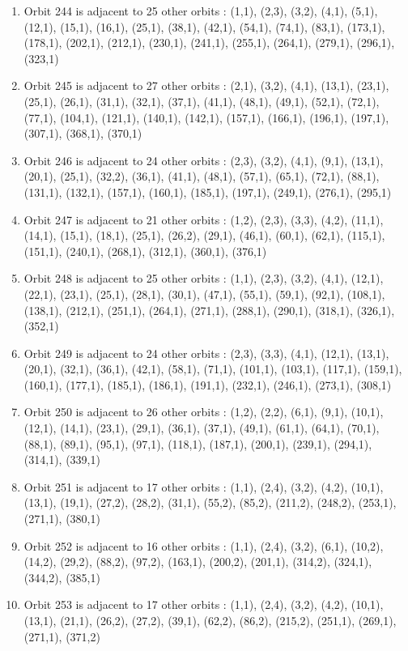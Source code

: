 \documentclass[12pt]{article}
\begin{document}
\begin{enumerate}
\item Orbit 244 is adjacent to 25 other orbits : (1,1), (2,3), (3,2), (4,1), (5,1), (12,1), (15,1), (16,1), (25,1), (38,1), (42,1), (54,1), (74,1), (83,1), (173,1), (178,1), (202,1), (212,1), (230,1), (241,1), (255,1), (264,1), (279,1), (296,1), (323,1)
\item Orbit 245 is adjacent to 27 other orbits : (2,1), (3,2), (4,1), (13,1), (23,1), (25,1), (26,1), (31,1), (32,1), (37,1), (41,1), (48,1), (49,1), (52,1), (72,1), (77,1), (104,1), (121,1), (140,1), (142,1), (157,1), (166,1), (196,1), (197,1), (307,1), (368,1), (370,1)
\item Orbit 246 is adjacent to 24 other orbits : (2,3), (3,2), (4,1), (9,1), (13,1), (20,1), (25,1), (32,2), (36,1), (41,1), (48,1), (57,1), (65,1), (72,1), (88,1), (131,1), (132,1), (157,1), (160,1), (185,1), (197,1), (249,1), (276,1), (295,1)
\item Orbit 247 is adjacent to 21 other orbits : (1,2), (2,3), (3,3), (4,2), (11,1), (14,1), (15,1), (18,1), (25,1), (26,2), (29,1), (46,1), (60,1), (62,1), (115,1), (151,1), (240,1), (268,1), (312,1), (360,1), (376,1)
\item Orbit 248 is adjacent to 25 other orbits : (1,1), (2,3), (3,2), (4,1), (12,1), (22,1), (23,1), (25,1), (28,1), (30,1), (47,1), (55,1), (59,1), (92,1), (108,1), (138,1), (212,1), (251,1), (264,1), (271,1), (288,1), (290,1), (318,1), (326,1), (352,1)
\item Orbit 249 is adjacent to 24 other orbits : (2,3), (3,3), (4,1), (12,1), (13,1), (20,1), (32,1), (36,1), (42,1), (58,1), (71,1), (101,1), (103,1), (117,1), (159,1), (160,1), (177,1), (185,1), (186,1), (191,1), (232,1), (246,1), (273,1), (308,1)
\item Orbit 250 is adjacent to 26 other orbits : (1,2), (2,2), (6,1), (9,1), (10,1), (12,1), (14,1), (23,1), (29,1), (36,1), (37,1), (49,1), (61,1), (64,1), (70,1), (88,1), (89,1), (95,1), (97,1), (118,1), (187,1), (200,1), (239,1), (294,1), (314,1), (339,1)
\item Orbit 251 is adjacent to 17 other orbits : (1,1), (2,4), (3,2), (4,2), (10,1), (13,1), (19,1), (27,2), (28,2), (31,1), (55,2), (85,2), (211,2), (248,2), (253,1), (271,1), (380,1)
\item Orbit 252 is adjacent to 16 other orbits : (1,1), (2,4), (3,2), (6,1), (10,2), (14,2), (29,2), (88,2), (97,2), (163,1), (200,2), (201,1), (314,2), (324,1), (344,2), (385,1)
\item Orbit 253 is adjacent to 17 other orbits : (1,1), (2,4), (3,2), (4,2), (10,1), (13,1), (21,1), (26,2), (27,2), (39,1), (62,2), (86,2), (215,2), (251,1), (269,1), (271,1), (371,2)

\end{enumerate}
\end{document}
